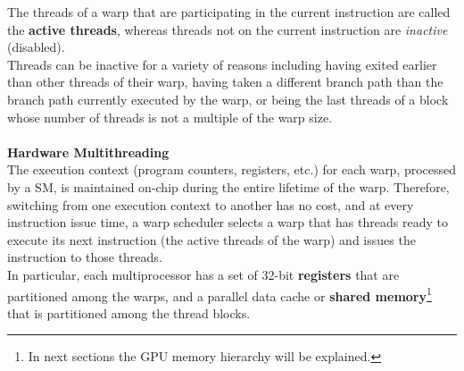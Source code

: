 
	The threads of a warp that are participating in the current instruction are called the \textbf{active threads}, whereas threads not on the current instruction are \textit{inactive} (disabled).\\
	Threads can be inactive for a variety of reasons including having exited earlier than other threads of their warp, having taken a different branch path than the branch path currently executed by the warp, or being the last threads of a block whose number of threads is not a multiple of the warp size\cite{cudaguide}.\\\\
	\textbf{\large{Hardware Multithreading}}\\	
	The execution context (program counters, registers, etc.) for each warp, processed by a SM, is maintained on-chip during the entire lifetime of the warp. Therefore, switching from one execution context to another has no cost, and at every instruction issue time, a warp scheduler selects a warp that has threads ready to execute its next instruction (the active threads of the warp) and issues the instruction to those threads.\\	
	In particular, each multiprocessor has a set of 32-bit \textbf{registers} that are partitioned among the warps, and a parallel data cache or \textbf{shared memory}\footnote{In next sections the GPU memory hierarchy will be explained.} that is partitioned among the thread blocks.
	
